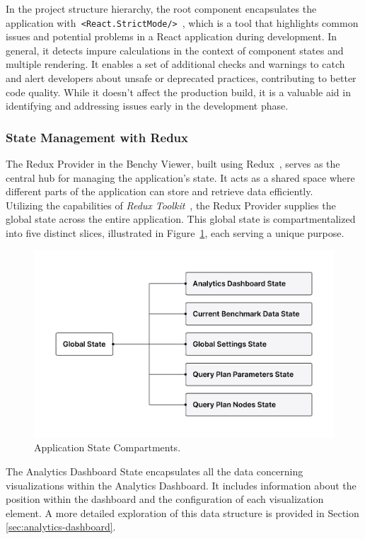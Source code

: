 In the project structure hierarchy, the root component encapsulates the application with\texttt{ <React.StrictMode/>}~\parencite{reactstrictmode}, which is a tool that highlights common issues and potential problems in a React application during development.
In general, it detects impure calculations in the context of component states and multiple rendering. It enables a set of additional checks and warnings to catch and alert developers about unsafe or deprecated practices, contributing to better code quality. While it doesn't affect the production build, it is a valuable aid in identifying and addressing issues early in the development phase.


\subsubsection{State Management with Redux}\label{sec:redux-structure}
The Redux Provider in the Benchy Viewer, built using Redux~\parencite{Redux}, serves as the central hub for managing the application's state. It acts as a shared space where different parts of the application can store and retrieve data efficiently.\\
Utilizing the capabilities of \textit{Redux Toolkit}~\parencite{redux-toolkit}, the Redux Provider supplies the global state across the entire application. This global state is compartmentalized into five distinct slices, illustrated in Figure~\ref{fig:global-state}, each serving a unique purpose.

\begin{figure}[h]
  \centering
  \includegraphics[width=0.8\linewidth]{figures/global-state.png}
  \caption{Application State Compartments.}
  \label{fig:global-state}
\end{figure}

The Analytics Dashboard State encapsulates all the data concerning visualizations within the Analytics Dashboard. It includes information about the position within the dashboard and the configuration of each visualization element. A more detailed exploration of this data structure is provided in Section \ref{sec:analytics-dashboard}.

